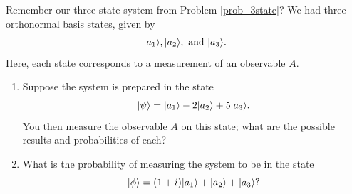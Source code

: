 \begin{problem}
\label{prob_3state2}
Remember our three-state system from Problem \ref{prob_3state}? We had three orthonormal basis states, given by
\[
| a_1 \rangle, | a_2 \rangle, \text{ and }  | a_3 \rangle.
\]
Here, each state corresponds to a measurement of an observable $A$.
\begin{enumerate}[label=(\alph*)]
\item Suppose the system is prepared in the state
\[
| \psi \rangle =  | a_1 \rangle - 2 | a_2 \rangle + 5 | a_3 \rangle.
\]
You then measure the observable $A$  on this state; what are the possible results and probabilities of each?

\item What is the probability of measuring the system to be in the state
\[
| \phi \rangle = (1+i) | a_1 \rangle + | a_2 \rangle +  | a_3 \rangle?
\]
\end{enumerate}
\end{problem}

